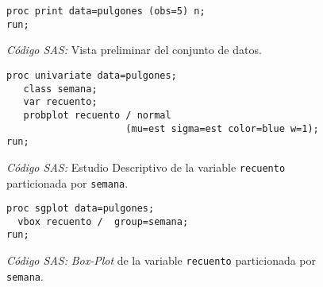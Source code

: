 \documentclass[11pt]{article}
\begin{document}
    \begin{figure}
      \centering
      \begin{verbatim}
proc print data=pulgones (obs=5) n;
run;
      \end{verbatim}
      \caption{\emph{Código SAS:} Vista preliminar del conjunto de datos.}
      \label{code:sas_2}
    \end{figure}

    \begin{figure}
      \centering
      \begin{verbatim}
proc univariate data=pulgones;
   class semana;
   var recuento;
   probplot recuento / normal
                     (mu=est sigma=est color=blue w=1);
run;
      \end{verbatim}
      \caption{\emph{Código SAS:} Estudio Descriptivo de la variable \texttt{recuento} particionada por \texttt{semana}.}
      \label{code:sas_3}
    \end{figure}

    \begin{figure}
      \centering
      \begin{verbatim}
proc sgplot data=pulgones;
  vbox recuento /  group=semana;
run;
      \end{verbatim}
      \caption{\emph{Código SAS:} \emph{Box-Plot} de la variable \texttt{recuento} particionada por \texttt{semana}.}
      \label{code:sas_4}
    \end{figure}


    \nocite{rano2017}

    
    
\end{document}
